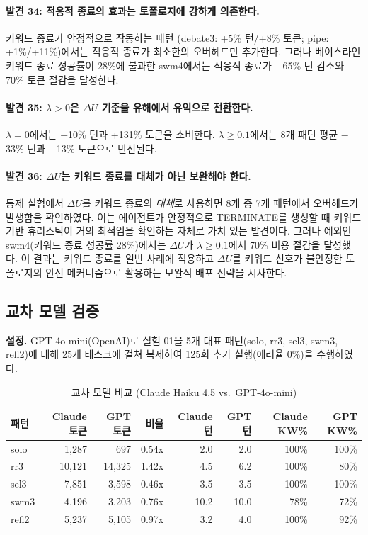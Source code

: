 \paragraph{발견 34: 적응적 종료의 효과는 토폴로지에 강하게 의존한다.}
키워드 종료가 안정적으로 작동하는 패턴 (debate3: +5\% 턴/+8\% 토큰; pipe: +1\%/+11\%)에서는 적응적 종료가 최소한의 오버헤드만 추가한다. 그러나 베이스라인 키워드 종료 성공률이 28\%에 불과한 swm4에서는 적응적 종료가 $-$65\% 턴 감소와 $-$70\% 토큰 절감을 달성한다.

\paragraph{발견 35: $\lambda > 0$은 $\Delta U$ 기준을 유해에서 유익으로 전환한다.}
$\lambda=0$에서는 +10\% 턴과 +131\% 토큰을 소비한다. $\lambda \geq 0.1$에서는 8개 패턴 평균 $-$33\% 턴과 $-$13\% 토큰으로 반전된다.

\paragraph{발견 36: $\Delta U$는 키워드 종료를 대체가 아닌 보완해야 한다.}
통제 실험에서 $\Delta U$를 키워드 종료의 \emph{대체}로 사용하면 8개 중 7개 패턴에서 오버헤드가 발생함을 확인하였다. 이는 에이전트가 안정적으로 TERMINATE를 생성할 때 키워드 기반 휴리스틱이 거의 최적임을 확인하는 자체로 가치 있는 발견이다. 그러나 예외인 swm4(키워드 종료 성공률 28\%)에서는 $\Delta U$가 $\lambda \geq 0.1$에서 70\% 비용 절감을 달성했다. 이 결과는 키워드 종료를 일반 사례에 적용하고 $\Delta U$를 키워드 신호가 불안정한 토폴로지의 안전 메커니즘으로 활용하는 보완적 배포 전략을 시사한다.

\subsection{교차 모델 검증}
\label{sec:cross-model}

\textbf{설정.} GPT-4o-mini(OpenAI)로 실험 01을 5개 대표 패턴(solo, rr3, sel3, swm3, refl2)에 대해 25개 태스크에 걸쳐 복제하여 125회 추가 실행(에러율 0\%)을 수행하였다.

\begin{table}[H]
\centering
\caption{교차 모델 비교 (Claude Haiku 4.5 vs.\ GPT-4o-mini)}
\label{tab:cross-model-tokens}
{\small
\begin{tabular}{lrrrrrrr}
\toprule
패턴 & Claude 토큰 & GPT 토큰 & 비율 & Claude 턴 & GPT 턴 & Claude KW\% & GPT KW\% \\
\midrule
solo  & 1,287  & 697    & 0.54x & 2.0  & 2.0  & 100\% & 100\% \\
rr3   & 10,121 & 14,325 & 1.42x & 4.5  & 6.2  & 100\% & 80\% \\
sel3  & 7,851  & 3,598  & 0.46x & 3.5  & 3.5  & 100\% & 100\% \\
swm3  & 4,196  & 3,203  & 0.76x & 10.2 & 10.0 & 78\%  & 72\% \\
refl2 & 5,237  & 5,105  & 0.97x & 3.2  & 4.0  & 100\% & 92\% \\
\bottomrule
\end{tabular}
}
\end{table}


